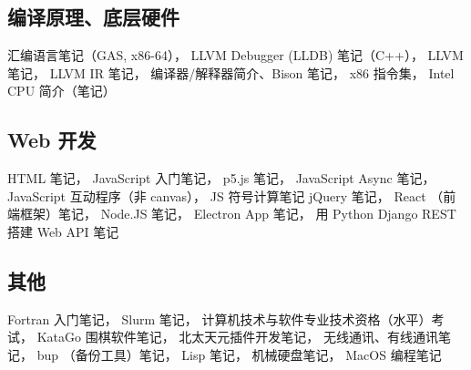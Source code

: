 \subsection{编译原理、底层硬件}
汇编语言笔记（GAS, x86-64），
LLVM Debugger (LLDB) 笔记（C++），
LLVM 笔记，
LLVM IR 笔记，
编译器/解释器简介、Bison 笔记，
x86 指令集，
Intel CPU 简介（笔记）

\subsection{Web 开发}
HTML 笔记，
JavaScript 入门笔记，
p5.js 笔记，
JavaScript Async 笔记，
JavaScript 互动程序（非 canvas），
JS 符号计算笔记
jQuery 笔记，
React （前端框架）笔记，
Node.JS 笔记，
Electron App 笔记，
用 Python Django REST 搭建 Web API 笔记

\subsection{其他}
Fortran 入门笔记，
Slurm 笔记，
计算机技术与软件专业技术资格（水平）考试，
KataGo 围棋软件笔记，
北太天元插件开发笔记，
无线通讯、有线通讯笔记，
bup （备份工具）笔记，
Lisp 笔记，
机械硬盘笔记，
MacOS 编程笔记
